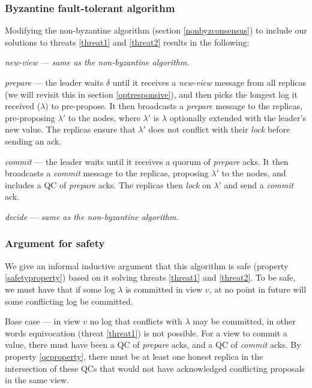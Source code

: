 \subsubsection{Byzantine fault-tolerant algorithm}
Modifying the non-byzantine algorithm (section \ref{nonbyzconsensus}) to include our solutions to threats \ref{threat1} and \ref{threat2} results in the following:

\begin{description}
	\item \textit{new-view} --- \textit{same as the non-byzantine algorithm.}
	\item \textit{prepare} --- the leader waits $\delta$ until it receives a \textit{new-view} message from all replicas (we will revisit this in section \ref{optresponsive}), and then picks the longest log it received ($\lambda$) to pre-propose. It then broadcasts a \textit{prepare} message to the replicas, pre-proposing $\lambda'$ to the nodes, where $\lambda'$ is $\lambda$ optionally extended with the leader's new value. The replicas ensure that $\lambda'$ does not conflict with their \textit{lock} before sending an ack.
	\item \textit{commit} --- the leader waits until it receives a quorum of \textit{prepare} acks. It then broadcasts a \textit{commit} message to the replicas, proposing $\lambda'$ to the nodes, and includes a QC of \textit{prepare} acks. The replicas then \textit{lock} on $\lambda'$ and send a \textit{commit} ack.
	\item \textit{decide} --- \textit{same as the non-byzantine algorithm.}
\end{description}

\subsubsection{Argument for safety}
We give an informal inductive argument that this algorithm is safe (property \ref{safetyproperty}) based on it solving threats \ref{threat1} and \ref{threat2}. To be safe, we must have that if some log $\lambda$ is committed in view $v$, at no point in future will some conflicting log be committed.

Base case --- in view $v$ no log that conflicts with $\lambda$ may be committed, in other words equivocation (threat \ref{threat1}) is not possible. For a view to commit a value, there must have been a QC of \textit{prepare} acks, and a QC of \textit{commit} acks. By property \ref{qcproperty}, there must be at least one honest replica in the intersection of these QCs that would not have acknowledged conflicting proposals in the same view.

